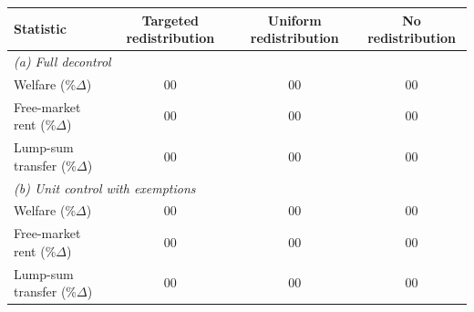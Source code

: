 \begin{table}[p]
\footnotesize
\renewcommand{\arraystretch}{1.2}
\renewcommand{\cellalign}{bc}
\begin{center}
\begin{tabular}{lccc}
\toprule
Statistic & Targeted redistribution & Uniform redistribution & No redistribution \\
\midrule
\multicolumn{3}{l}{\textit{(a) Full decontrol}}\\
Welfare (\%$\Delta$) & 00 & 00 & 00 \\
Free-market rent (\%$\Delta$) & 00 & 00 & 00 \\
Lump-sum transfer (\%$\Delta$) & 00 & 00 & 00 \\
\multicolumn{3}{l}{\textit{(b) Unit control with exemptions}}\\
Welfare (\%$\Delta$) & 00 & 00 & 00 \\
Free-market rent (\%$\Delta$) & 00 & 00 & 00 \\
Lump-sum transfer (\%$\Delta$) & 00 & 00 & 00 \\
\bottomrule
\end{tabular}
\end{center}
\normalsize
\end{table}